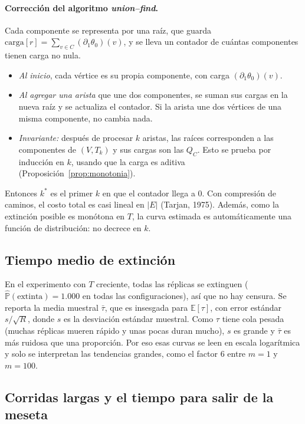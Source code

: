 \documentclass[11pt,a4paper]{article}
\theoremstyle{plain}
\theoremstyle{remark}
\begin{document}
\paragraph{Corrección del algoritmo \emph{union--find}.} Cada componente se representa por una raíz, que guarda $\text{carga}[r]=\sum_{v\in C}(\partial_1\theta_0)(v)$, y se lleva un contador de cuántas componentes tienen carga no nula.
\begin{itemize}[nosep]
  \item \textit{Al inicio}, cada vértice es su propia componente, con carga $(\partial_1\theta_0)(v)$.
  \item \textit{Al agregar una arista} que une dos componentes, se suman sus cargas en la nueva raíz y se actualiza el contador. Si la arista une dos vértices de una misma componente, no cambia nada.
  \item \textit{Invariante:} después de procesar $k$ aristas, las raíces corresponden a las componentes de $(V,T_k)$ y sus cargas son las $Q_C$. Esto se prueba por inducción en $k$, usando que la carga es aditiva (Proposición~\ref{prop:monotonia}).
\end{itemize}
Entonces $k^\ast$ es el primer $k$ en que el contador llega a $0$. Con compresión de caminos, el costo total es casi lineal en $|E|$ (Tarjan, 1975). Además, como la extinción posible es monótona en $T$, la curva estimada es automáticamente una función de distribución: no decrece en $k$.

\subsection{Tiempo medio de extinción}\label{sec:fund-media}

En el experimento con $T$ creciente, todas las réplicas se extinguen ($\hat{\mathbb{P}}(\text{extinta})=1.000$ en todas las configuraciones), así que no hay censura. Se reporta la media muestral $\bar\tau$, que es insesgada para $\mathbb{E}[\tau]$, con error estándar $s/\sqrt R$, donde $s$ es la desviación estándar muestral. Como $\tau$ tiene cola pesada (muchas réplicas mueren rápido y unas pocas duran mucho), $s$ es grande y $\bar\tau$ es más ruidosa que una proporción. Por eso esas curvas se leen en escala logarítmica y solo se interpretan las tendencias grandes, como el factor 6 entre $m=1$ y $m=100$.

\subsection{Corridas largas y el tiempo para salir de la meseta}\label{sec:fund-largas}
\end{document}
